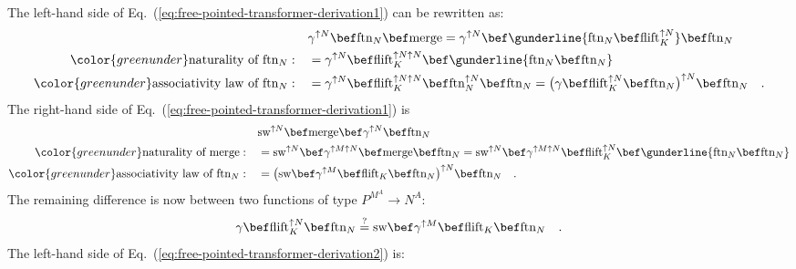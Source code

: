 The left-hand side of Eq.~(\ref{eq:free-pointed-transformer-derivation1})
can be rewritten as:
\begin{align*}
 & \gamma^{\uparrow N}\bef\text{ftn}_{N}\bef\text{merge}=\gamma^{\uparrow N}\bef\gunderline{\text{ftn}_{N}\bef\text{flift}_{K}^{\uparrow N}}\bef\text{ftn}_{N}\\
{\color{greenunder}\text{naturality of }\text{ftn}_{N}:}\quad & =\gamma^{\uparrow N}\bef\text{flift}_{K}^{\uparrow N\uparrow N}\bef\gunderline{\text{ftn}_{N}\bef\text{ftn}_{N}}\\
{\color{greenunder}\text{associativity law of }\text{ftn}_{N}:}\quad & =\gamma^{\uparrow N}\bef\text{flift}_{K}^{\uparrow N\uparrow N}\bef\text{ftn}_{N}^{\uparrow N}\bef\text{ftn}_{N}=\big(\gamma\bef\text{flift}_{K}^{\uparrow N}\bef\text{ftn}_{N}\big)^{\uparrow N}\bef\text{ftn}_{N}\quad.
\end{align*}
The right-hand side of Eq.~(\ref{eq:free-pointed-transformer-derivation1})
is
\begin{align*}
 & \text{sw}^{\uparrow N}\bef\text{merge}\bef\gamma^{\uparrow N}\bef\text{ftn}_{N}\\
{\color{greenunder}\text{naturality of }\text{merge}:}\quad & =\text{sw}^{\uparrow N}\bef\gamma^{\uparrow M\uparrow N}\bef\text{merge}\bef\text{ftn}_{N}=\text{sw}^{\uparrow N}\bef\gamma^{\uparrow M\uparrow N}\bef\text{flift}_{K}^{\uparrow N}\bef\gunderline{\text{ftn}_{N}\bef\text{ftn}_{N}}\\
{\color{greenunder}\text{associativity law of }\text{ftn}_{N}:}\quad & =\big(\text{sw}\bef\gamma^{\uparrow M}\bef\text{flift}_{K}\bef\text{ftn}_{N}\big)^{\uparrow N}\bef\text{ftn}_{N}\quad.
\end{align*}
The remaining difference is now between two functions of type $P^{M^{A}}\rightarrow N^{A}$:
\begin{equation}
\gamma\bef\text{flift}_{K}^{\uparrow N}\bef\text{ftn}_{N}\overset{?}{=}\text{sw}\bef\gamma^{\uparrow M}\bef\text{flift}_{K}\bef\text{ftn}_{N}\quad.\label{eq:free-pointed-transformer-derivation2}
\end{equation}
The left-hand side of Eq.~(\ref{eq:free-pointed-transformer-derivation2})
is:
